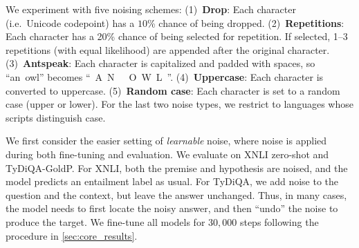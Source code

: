 \documentclass[11pt,a4paper]{article}
\begin{document}
We experiment with five noising schemes: (1)~\textbf{Drop}: Each character (i.e.~Unicode codepoint) has a $10$\% chance of being dropped. (2)~\textbf{Repetitions}: Each character has a 20\% chance of being selected for repetition. If selected, 1--3 repetitions (with equal likelihood) are appended after the original character. (3)~\textbf{Antspeak}: Each character is capitalized and padded with spaces, so ``an~owl'' becomes ``~A~N~~~O~W~L~''. (4)~\textbf{Uppercase}: Each character is converted to uppercase. (5)~\textbf{Random case}: Each character is set to a random case (upper or lower). For the last two noise types, we restrict to languages whose scripts distinguish case.

We first consider the easier setting of \emph{learnable} noise, where noise is applied during both fine-tuning and evaluation. We evaluate on XNLI zero-shot and TyDiQA-GoldP\@. For XNLI, both the premise and hypothesis are noised, and the model predicts an entailment label as usual. For TyDiQA, we add noise to the question and the context, but leave the answer unchanged. Thus, in many cases, the model needs to first locate the noisy answer, and then ``undo'' the noise to produce the target. We fine-tune all models for $30{,}000$ steps following the procedure in \cref{sec:core_results}.
\end{document}
